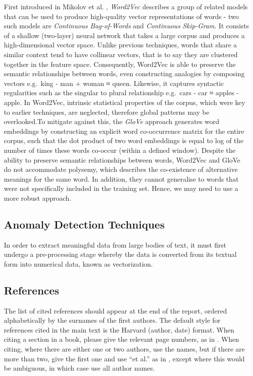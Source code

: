 \documentclass[12pt,a4paper]{article}
\begin{document}
First introduced in Mikolov et al. \cite{mikolov2013efficient}, \textit{Word2Vec} describes a group of related models that can be used to produce high-quality vector representations of words - two such models are \textit{Continuous Bag-of-Words} and \textit{Continuous Skip-Gram}. It consists of a shallow (two-layer) neural network that takes a large corpus and produces a high-dimensional vector space. Unlike previous techniques, words that share a similar context tend to have collinear vectors, that is to say they are clustered together in the feature space. Consequently, Word2Vec is able to preserve the semantic relationships between words, even constructing analogies by composing vectors e.g.\ king - man + woman ≈ queen. Likewise, it captures syntactic regularities such as the singular to plural relationship e.g.\ cars - car ≈ apples - apple. In Word2Vec, intrinsic statistical properties of the corpus, which were key to earlier techniques, are neglected, therefore global patterns may be overlooked.To mitigate against this, the \textit{GloVe} \cite{pennington2014glove} approach generates word embeddings by constructing an explicit word co-occurrence matrix for the entire corpus, such that the dot product of two word embeddings is equal to log of the number of times these words co-occur (within a defined window). Despite the ability to preserve semantic relationships between words, Word2Vec and GloVe do not accommodate polysemy, which describes the co-existence of alternative meanings for the same word. In addition, they cannot generalise to words that were not specifically included in the training set. Hence, we may need to use a more robust approach.


\subsection{Anomaly Detection Techniques}
In order to extract meaningful data from large bodies of text, it must first undergo a pre-processing stage whereby the data is converted from its textual form into numerical data, known as vectorization. 

\newpage

\subsection{References}
\cite{robertson1976relevance}
\cite{pennington2014glove}
\cite{mikolov2013efficient}
The list of cited references should appear at the end of the report,
ordered alphabetically by the surnames of the first authors.
The default style for references cited in the main text is the  Harvard (author, date) format.
When citing a section in a book, please give the relevant page numbers, as in \cite[p293]{budgen}.
When citing, where there are either one or two authors, use the names,
but if there are more than two, give the first one and use ``et al.''
as in  , except where this would be ambiguous, in which case use all author names.
\end{document}
